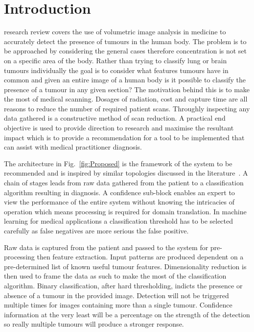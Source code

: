 \documentclass[journal]{IEEEtran}
\begin{document}
\IEEEpeerreviewmaketitle







\section{Introduction}
 research review covers the use of volumetric image analysis in medicine to accurately detect the presence of tumours in the human body. 
The problem is to be approached by considering the general cases therefore concentration is not set on a specific area of the body.
Rather than trying to classify lung or brain tumours individually the goal is to consider what features tumours have in common and given an entire image of a human body is it possible to classify the presence of a tumour in any given section?
The motivation behind this is to make the most of medical scanning.
Dosages of radiation, cost and capture time are all reasons to reduce the number of required patient scans.
Throughly inspecting any data gathered is a constructive method of scan reduction.
A practical end objective is used to provide direction to research and maximise the resultant impact which is to provide a recommendation for a tool to be implemented that can assist with medical practitioner diagnosis.  

The architecture in Fig.~\ref{fig:Proposed} is the framework of the system to be recommended and is inspired by similar topologies discussed in the literature~\cite{ahmed2011efficacy,kumar2011classification,hau07feat,sachdeva2011multiclass,kostis03three}.
A chain of stages leads from raw data gathered from the patient to a classification algorithm resulting in diagnosis.
A confidence sub-block enables an expert to view the performance of the entire system without knowing the intricacies of operation which means processing is required for domain translation.
In machine learning for medical applications a classification threshold has to be selected carefully as false negatives are more serious the false positive.

Raw data is captured from the patient and passed to the system for pre-processing then feature extraction.
Input patterns are produced dependent on a pre-determined list of known useful tumour features. 
Dimensionality reduction is then used to frame the data as such to make the most of the classification algorithm.
Binary classification, after hard thresholding, indicts the presence or absence of a tumour in the provided image.
Detection will not be triggered multiple times for images containing more than a single tumour. 
Confidence information at the very least will be a percentage on the strength of the detection so really multiple tumours will produce a stronger response. 
\end{document}
